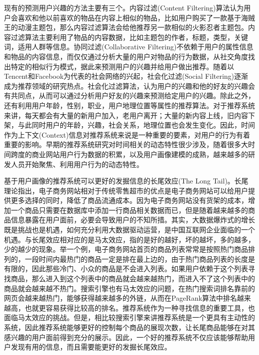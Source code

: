 	现有的预测用户兴趣的方法主要有三个。内容过滤(Content Filtering)\citep{content-based}算法认为用户会喜欢和他以前喜欢的物品在内容上相似的物品，比如用户购买了一款基于海贼王的动漫主题包，那么内容过滤算法会给他推荐另一款相似的火影忍者主题包。内容过滤算法主要利用了物品的内容数据，比如主题包的作者，标题，类型，关键词，适用人群等信息。协同过滤(Collaborative Filtering)\citep{collab-filter}不依赖于用户的属性信息和物品的内容信息，而仅仅通过分析大量的用户对物品的行为数据，从社交角度找出特定的相似行为模式，据此来预测用户的兴趣并给用户做出推荐。随着以Tencent和Facebook为代表的社会网络的兴起，社会化过滤(Social Filtering)逐渐成为推荐领域的研究热点。社会化过滤算法\citep{social-filter}，认为用户的兴趣和他的好友的兴趣会有共同点，从而可以通过分析用户好友的兴趣来预测给定用户的兴趣。除此之外，还有利用用户年龄，性别，职业，用户地理位置等属性的推荐算法。对于推荐系统来讲，每天都会有大量的新用户加入，老用户离开；大量的新内容上线，旧内容下架，与此同时用户的年龄，兴趣，社会关系，地理位置也会发生变化。因此，时间作为上下文(Context)信息对推荐系统来说是一种重要的要素，对用户的行为有着重要的影响。早期的推荐系统研究对时间相关的动态特性很少涉及，随着很多大时间跨度的商业网站用户行为数据的积累，以及用户画像建模的成熟，越来越多的研发人员开始聚焦、利用用户行为的动态特性。

	基于用户画像的推荐系统可以更好的发掘信息的长尾效应(The Long Tail)。长尾理论\citep{long-tail}指出，电子商务网站相对于传统零售超市的优点是电子商务网站可以给用户提供更多选择的同时，降低了商品流通成本。因为电子商务网站没有货架的成本，增加一个商品只需要在数据库中添加一行商品相关数据而已，但是随着越来越多的商品信息暴露在用户面前，必要会导致用户的不知所措。其实，大数据爆炸式的增长既是挑战也是机遇，如何充分利用大数据驱动运营，是中国互联网企业面临的一个机遇。与长尾效应相对应的是马太效应\citep{matthew-effect}，指的是好的越好，坏的越坏，多的越多，少的越少的现象。举一个例，电子商务网站首页的商品列表常常是按照热门商品排列的，一段时间内最热门的商品一定是排在最上边的，由于热门商品列表的长度是有限的，因此那些冷门、小众的商品是不会进入列表。如果用户依赖于这个列表寻找商品，那么进入到这个列表中的商品就会越来越热门，而进入不了这个列表中的商品就会越来越不热门。搜索引擎也有马太效应的问题\citep{matthew-effect:2}，在热门搜索词排名靠前的网页会越来越热门，能够获得越来越多的外链，从而在PageRank算法中排名越来越高，也就更容易获得比较高的排名。推荐系统作为一种寻找信息的重要工具，也面临马太效应的挑战\citep{matthew-effect:3}。但是，相比较搜索引擎来讲推荐系统是一个更具有主动性的系统，因此推荐系统能够更好的控制每个商品的展现次数，让长尾商品能够在对其感兴趣的用户面前得到充分的展示。因此，一个好的推荐系统不仅应该能够帮助用户发现有用的信息，而且需要能更好的发掘长尾效应。

